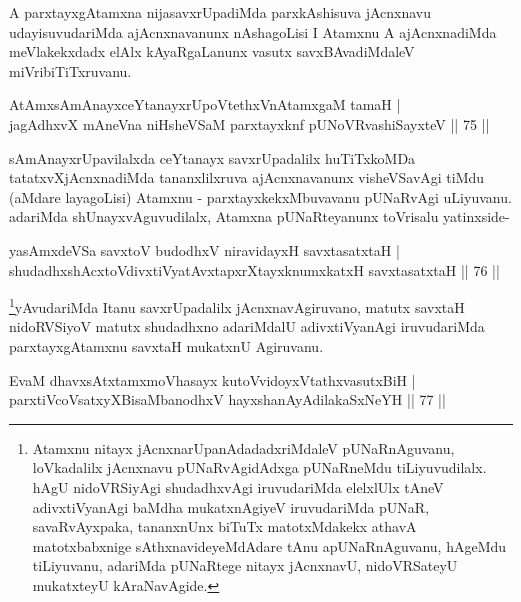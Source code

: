 \begin{artha}
A parxtayxgAtamxna nijasavxrUpadiMda parxkAshisuva jAcnxnavu udayisuvudariMda ajAcnxnavanunx nAshagoLisi I Atamxnu A ajAcnxnadiMda meVlakekxdadx elAlx kAyaRgaLanunx vasutx savxBAvadiMdaleV miVribiTiTxruvanu.
\end{artha}


\begin{shl}
AtAmx\s sAmAnayxceYtanayxrUpoVtethxVnA\s \s tamxgaM tamaH |\\
jagAdhxvX mAneVna niHsheVSaM parxtayxknf pUNoVR\s vashiSayxteV \hfill || 75 ||
\end{shl}

\begin{artha}
sAmAnayxrUpavilalxda ceYtanayx savxrUpadalilx huTiTxkoMDa tatatxvXjAcnxnadiMda tananxlilxruva ajAcnxnavanunx visheVSavAgi tiMdu (aMdare layagoLisi) Atamxnu - parxtayxkekxMbuvavanu pUNaRvAgi uLiyuvanu. adariMda shUnayxvAguvudilalx, Atamxna pUNaRteyanunx toVrisalu yatinxside-
\end{artha}


\begin{shl}
yasAmxdeVSa savxtoV budodhxV niravidayxH savxtasatxtaH |\\
shudadhxshAcxtoV\s divxtiVyatAvxtapxrXtayxknumxkatxH savxtasatxtaH \hfill || 76 ||
\end{shl}

\begin{artha}
\footnote{Atamxnu nitayx jAcnxnarUpanAdadadxriMdaleV pUNaRnAguvanu, loVkadalilx jAcnxnavu pUNaRvAgidAdxga pUNaRneMdu tiLiyuvudilalx. hAgU nidoVRSiyAgi shudadhxvAgi iruvudariMda elelxlUlx tAneV adivxtiVyanAgi baMdha mukatxnAgiyeV iruvudariMda pUNaR, savaRvAyxpaka, tananxnUnx biTuTx matotxMdakekx athavA matotxbabxnige sAthxnavideyeMdAdare tAnu apUNaRnAguvanu, hAgeMdu tiLiyuvanu, adariMda pUNaRtege nitayx jAcnxnavU, nidoVRSateyU mukatxteyU kAraNavAgide.}yAvudariMda Itanu savxrUpadalilx jAcnxnavAgiruvano, matutx savxtaH nidoRVSiyoV matutx shudadhxno adariMdalU adivxtiVyanAgi iruvudariMda parxtayxgAtamxnu savxtaH mukatxnU Agiruvanu.
\end{artha}%

\begin{shl}
EvaM dhavxsAtxtamxmoVhasayx kutoV\s vidoyxVtathxvasutxBiH |\\
parxtiVcoV\s satxyXBisaMbanodhxV hayxshanAyAdilakaSxNeYH \hfill || 77 ||
\end{shl}

